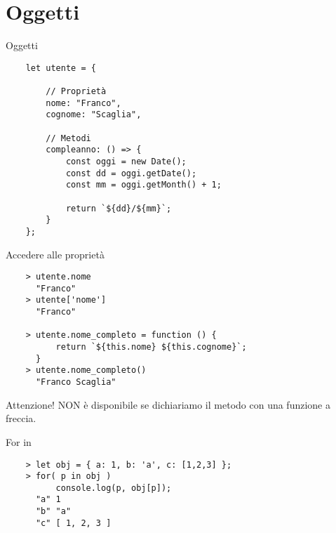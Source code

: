 \section{Oggetti}
\begin{frame}[fragile]{Oggetti}\transfade\centering
  \begin{verbatim}
    let utente = {

        // Proprietà
        nome: "Franco",
        cognome: "Scaglia",

        // Metodi
        compleanno: () => {
            const oggi = new Date();
            const dd = oggi.getDate();
            const mm = oggi.getMonth() + 1;

            return `${dd}/${mm}`;
        }
    };
  \end{verbatim}
\end{frame}

\begin{frame}[fragile]{Accedere alle proprietà}\transfade\centering
  \begin{verbatim}
    > utente.nome
      "Franco"
    > utente['nome']
      "Franco"

    > utente.nome_completo = function () {
          return `${this.nome} ${this.cognome}`;
      }
    > utente.nome_completo()
      "Franco Scaglia"
  \end{verbatim}
  \bigskip
  \alert{Attenzione!}  NON è disponibile se dichiariamo il metodo con una funzione a freccia.\\
\end{frame}

\begin{frame}[fragile]{For in}\transfade\centering
  \begin{verbatim}
    > let obj = { a: 1, b: 'a', c: [1,2,3] };
    > for( p in obj )
          console.log(p, obj[p]);
      "a" 1
      "b" "a"
      "c" [ 1, 2, 3 ]
  \end{verbatim}
\end{frame}